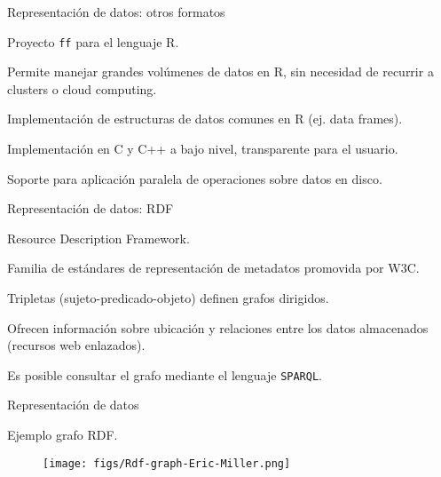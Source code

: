 \begin{frame}{Representación de datos: otros formatos}
 \begin{wideitemize}
  \item Proyecto \texttt{ff} para el lenguaje R.
  \item Permite manejar grandes volúmenes de datos en R, sin necesidad de recurrir
  a clusters o cloud computing.
  \item Implementación de estructuras de datos comunes en R (ej. data frames).
  \item Implementación en C y C++ a bajo nivel, transparente para el usuario.
  \item Soporte para aplicación paralela de operaciones sobre datos en disco.
 \end{wideitemize}

\end{frame}


\begin{frame}{Representación de datos: RDF}
 \begin{wideitemize}
  \item Resource Description Framework.
  \item Familia de estándares de representación de metadatos promovida por W3C.
  \item Tripletas (sujeto-predicado-objeto) definen grafos dirigidos.
  \item Ofrecen información sobre ubicación y relaciones entre los datos almacenados
  (recursos web enlazados).
  \item Es posible consultar el grafo mediante el lenguaje \texttt{SPARQL}.
 \end{wideitemize}

\end{frame}


\begin{frame}{Representación de datos}
\begin{wideitemize}
 \item Ejemplo grafo RDF.
\end{wideitemize}

 \begin{figure}
  \centering
  \texttt{[image: figs/Rdf-graph-Eric-Miller.png]} 
\end{figure}

\end{frame}

